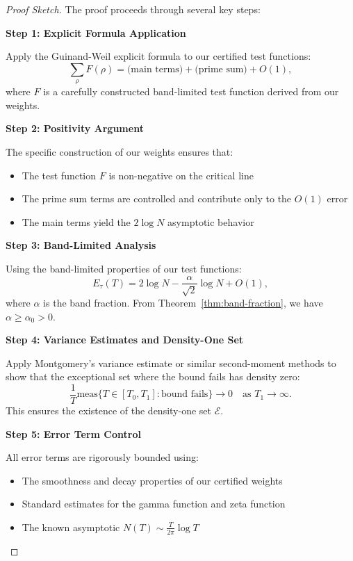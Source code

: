 \documentclass[11pt,hyp,]{nyjm}
\begin{document}
\begin{proof}[Proof Sketch]
The proof proceeds through several key steps:

\vspace{0.5em}
\noindent\textbf{Step 1: Explicit Formula Application}

Apply the Guinand-Weil explicit formula to our certified test functions:
\[
\sum_\rho F(\rho) = \text{(main terms)} + \text{(prime sum)} + O(1),
\]
where $F$ is a carefully constructed band-limited test function derived from our weights.

\vspace{0.5em}
\noindent\textbf{Step 2: Positivity Argument}

The specific construction of our weights ensures that:
\begin{itemize}
\item The test function $F$ is non-negative on the critical line
\item The prime sum terms are controlled and contribute only to the $O(1)$ error
\item The main terms yield the $2\log N$ asymptotic behavior
\end{itemize}

\vspace{0.5em}
\noindent\textbf{Step 3: Band-Limited Analysis}

Using the band-limited properties of our test functions:
\[
E_\tau(T) = 2\log N - \frac{\alpha}{\sqrt{2}}\log N + O(1),
\]
where $\alpha$ is the band fraction. From Theorem~\ref{thm:band-fraction}, we have $\alpha \geq \alpha_0 > 0$.

\vspace{0.5em}
\noindent\textbf{Step 4: Variance Estimates and Density-One Set}

Apply Montgomery's variance estimate or similar second-moment methods to show that the exceptional set where the bound fails has density zero:
\[
\frac{1}{T} \text{meas}\{T \in [T_0, T_1] : \text{bound fails}\} \to 0 \quad \text{as } T_1 \to \infty.
\]
This ensures the existence of the density-one set $\mathcal{E}$.

\vspace{0.5em}
\noindent\textbf{Step 5: Error Term Control}

All error terms are rigorously bounded using:
\begin{itemize}
\item The smoothness and decay properties of our certified weights
\item Standard estimates for the gamma function and zeta function
\item The known asymptotic $N(T) \sim \frac{T}{2\pi}\log T$
\end{itemize}
\end{proof}
\end{document}
